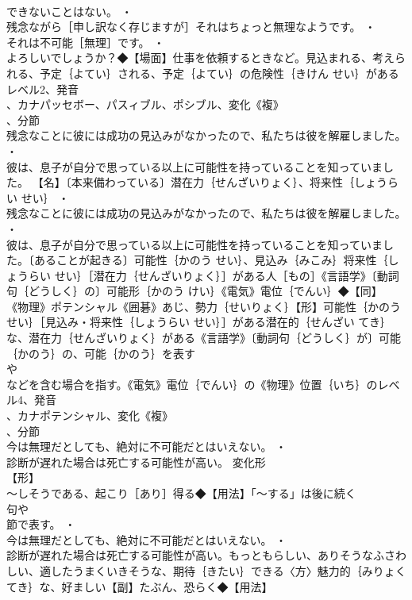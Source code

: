 \documentclass[8pt]{extreport}
\begin{document}
\begin{CJK}{UTF8}{min}
\\	できないことはない。 ・
\\	残念ながら［申し訳なく存じますが］それはちょっと無理なようです。 ・
\\	それは不可能［無理］です。 ・
\\	よろしいでしょうか？◆【場面】仕事を依頼するときなど。見込まれる、考えられる、予定｛よてい｝される、予定｛よてい｝の危険性｛きけん せい｝があるレベル2、発音
\\	、カナパッセボー、パスィブル、ポシブル、変化《複》
\\	、分節
\\	残念なことに彼には成功の見込みがなかったので、私たちは彼を解雇しました。 ・
\\	彼は、息子が自分で思っている以上に可能性を持っていることを知っていました。		【名】〔本来備わっている〕潜在力｛せんざいりょく｝、将来性｛しょうらい せい｝ ・
\\	残念なことに彼には成功の見込みがなかったので、私たちは彼を解雇しました。 ・
\\	彼は、息子が自分で思っている以上に可能性を持っていることを知っていました。〔あることが起きる〕可能性｛かのう せい｝、見込み｛みこみ｝将来性｛しょうらい せい｝［潜在力｛せんざいりょく｝］がある人［もの］《言語学》〔動詞句｛どうしく｝の〕可能形｛かのう けい｝《電気》電位｛でんい｝◆【同】
\\	《物理》ポテンシャル《囲碁》あじ、勢力｛せいりょく｝【形】可能性｛かのう せい｝［見込み・将来性｛しょうらい せい｝］がある潜在的｛せんざい てき｝な、潜在力｛せんざいりょく｝がある《言語学》〔動詞句｛どうしく｝が〕可能｛かのう｝の、可能｛かのう｝を表す
\\	や
\\	などを含む場合を指す。《電気》電位｛でんい｝の《物理》位置｛いち｝のレベル4、発音
\\	、カナポテンシャル、変化《複》
\\	、分節
\\	今は無理だとしても、絶対に不可能だとはいえない。 ・
\\	診断が遅れた場合は死亡する可能性が高い。	変化形 
\\	【形】
\\	～しそうである、起こり［あり］得る◆【用法】「～する」は後に続く
\\	句や
\\	節で表す。 ・
\\	今は無理だとしても、絶対に不可能だとはいえない。 ・
\\	診断が遅れた場合は死亡する可能性が高い。もっともらしい、ありそうなふさわしい、適したうまくいきそうな、期待｛きたい｝できる〈方〉魅力的｛みりょく てき｝な、好ましい【副】たぶん、恐らく◆【用法】

\end{CJK}
\end{document}
